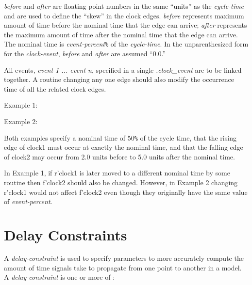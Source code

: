 {\begin{pespace}
\begin{description}
\item {\em before} and {\em after} are floating point numbers in the same
``units'' as the {\em cycle-time} and are used to define the ``skew'' in the
clock edges.  {\em before} represents maximum amount of time before the
nominal time that the edge can arrive; {\em after} represents the maximum
amount of time after the nominal time that the edge can arrive.  The nominal
time is {\em event-percent}{\verb|%|} of the {\em cycle-time}.  In the
unparenthesized form for the {\em clock-event}, {\em before} and {\em after}
are assumed ``0.0.''
\end{description}

All events, {\em event-1 ... event-n}, specified in a single {\em
.clock\_event} are to be linked together.  A routine changing any one edge
should also modify the occurrence time of all the related clock edges.  

Example 1:

Example 2:

Both examples specify a nominal time of 50{\verb|%|} of the cycle time, that
the rising edge of clock1 must occur at exactly the nominal time, and that
the falling edge of clock2 may occur from 2.0 units before to 5.0 units
after the nominal time.

In Example 1, if r'clock1 is later moved to a different nominal time by some
routine then f'clock2 should also be changed.  However, in Example 2 changing
r'clock1 would not affect f'clock2 even though they originally have the same
value of {\em event-percent}.

\section{Delay Constraints}

A {\em delay-constraint} is used to specify parameters to more accurately
compute the amount of time signals take to propagate from one point to
another in a model.  A {\em delay-constraint} is one or more of :


\end{pespace}}
